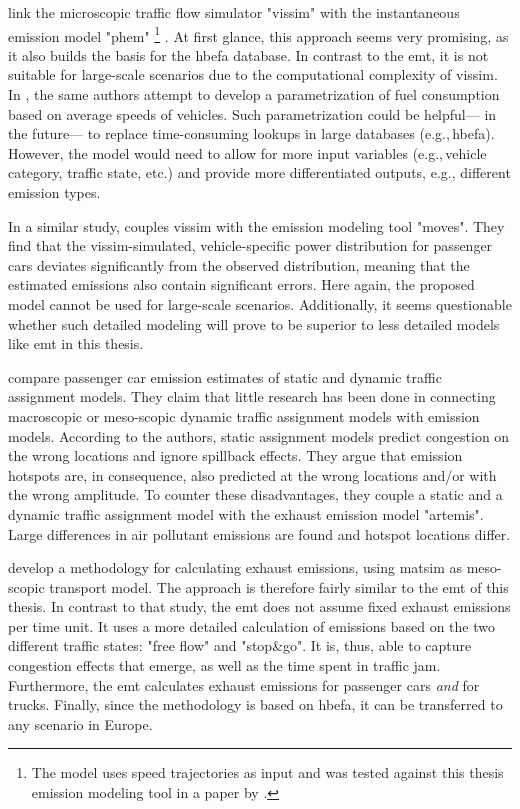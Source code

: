 \citet{HirschmannEtAl_ITSC_2010} link the microscopic traffic flow simulator "\gls{vissim}" with the instantaneous 
emission model "\gls{phem}"%
%
\footnote{
%
The model uses speed trajectories as input and was tested against this thesis emission 
modeling tool in a paper by 
\citet{HuelsmannEtAl_LAS_2011}.
%
}%
. At first glance, this approach seems very promising, as it also builds the 
basis for the \gls{hbefa} database. In contrast to the \gls{emt}, it is not 
suitable for large-scale scenarios due to the computational complexity of 
\gls{vissim}.
%
In \citet{Kraschl-HirschmannEtAl_FISTS_2011}, the same authors attempt to 
develop a parametrization of fuel consumption based on average speeds of 
vehicles. Such parametrization could be helpful--- in the future--- to replace 
time-consuming lookups in large databases (e.g.,\,\gls{hbefa}). However, the 
model would need to allow for more input variables (e.g.,\,vehicle category, 
traffic state, etc.) and provide more differentiated outputs, e.g., 
different emission types.

In a similar study, \citet{SongEtAl_TRR_2012} couples \gls{vissim} with the emission modeling tool "\gls{moves}". They find 
that the \gls{vissim}-simulated, vehicle-specific power distribution for 
passenger cars deviates significantly from the observed distribution, meaning that  the estimated emissions also contain significant errors. Here 
again, the proposed model cannot be used for large-scale scenarios. Additionally, it seems questionable whether such detailed 
modeling will prove to be superior to less detailed models like \gls{emt} in 
this thesis.

\citet{WismansEtAl_TRB_2013} compare passenger car emission 
estimates of static and dynamic traffic assignment models. They claim that 
little research has been done in connecting macroscopic or meso-scopic dynamic 
traffic assignment models with emission models.
%
According to the authors, static assignment models predict congestion on the 
wrong locations and ignore spillback effects. They argue that emission 
hotspots are, in consequence, also predicted at the wrong locations and/or 
with the wrong amplitude.
%
To counter these disadvantages, they couple a static and a dynamic traffic assignment model with 
the exhaust emission model "\gls{artemis}". Large differences in air 
pollutant emissions are found and hotspot locations differ.

\citet{HatzopoulouMiller_TransResD_2010} develop a methodology for 
calculating exhaust emissions, using \gls{matsim} as meso-scopic transport 
model. The approach is therefore fairly similar to the \gls{emt} of this thesis.
%
In contrast to that study, the \gls{emt} does not assume fixed exhaust 
emissions per time unit. It uses a more detailed calculation of emissions based 
on the two different traffic states: "free flow" and "stop\&go". It is, thus, 
able to capture congestion effects that emerge, as well as the time spent 
in traffic jam. 
Furthermore, the \gls{emt} calculates exhaust emissions for passenger cars 
\emph{and} for trucks. Finally, since the methodology is based on \gls{hbefa}, 
it can be transferred to any scenario in Europe.

